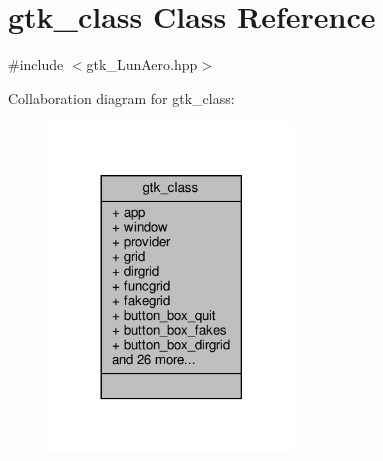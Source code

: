 \hypertarget{classgtk__class}{}\section{gtk\+\_\+class Class Reference}
\label{classgtk__class}


{\ttfamily \#include $<$gtk\+\_\+\+Lun\+Aero.\+hpp$>$}



Collaboration diagram for gtk\+\_\+class\+:
\nopagebreak
\begin{figure}[H]
\begin{center}
\leavevmode
\includegraphics[width=185pt]{classgtk__class__coll__graph}
\end{center}
\end{figure}
